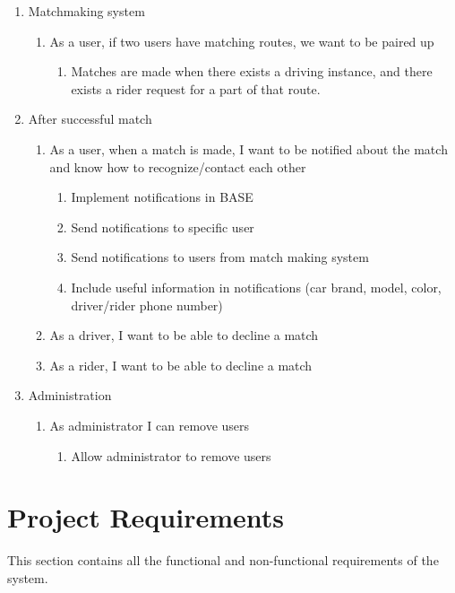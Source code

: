 \documentclass{article}
\begin{document}
\begin{enumerate}
  \item Matchmaking system
  \begin{enumerate}
      \item As a user, if two users have matching routes, we want to be paired up
      \begin{enumerate}
          \item Matches are made when there exists a driving instance, and there exists a rider request for a part of that route.
      \end{enumerate}
  \end{enumerate}
  
  \item After successful match
  \begin{enumerate}
      \item As a user, when a match is made, I want to be notified about the match and know how to recognize/contact each other
      \begin{enumerate}
          \item Implement notifications in BASE
          \item Send notifications to specific user
          \item Send notifications to users from match making system
          \item Include useful information in notifications (car brand, model, color, driver/rider phone number)
      \end{enumerate}
      \item As a driver, I want to be able to decline a match
      \item As a rider, I want to be able to decline a match
  \end{enumerate}
  
  \item Administration
  \begin{enumerate}
      \item As administrator I can remove users
      \begin{enumerate}
          \item Allow administrator to remove users
      \end{enumerate}
  \end{enumerate}
  
\end{enumerate}

\newpage
\section{Project Requirements}
This section contains all the functional and non-functional requirements of the system.
\end{document}
